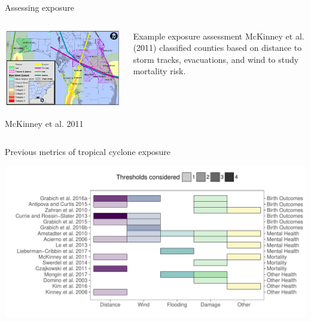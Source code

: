\documentclass[ignorenonframetext,]{beamer}
\begin{document}
\begin{frame}{Assessing exposure}

\begin{columns}
\begin{column}{0.7\textwidth}

\begin{center}\includegraphics[width=\textwidth]{florida_direct_indirect_mortality_figure} \end{center}
\vspace{-0.6cm}
\begin{center}
\footnotesize McKinney et al. 2011
\end{center}
\end{column}
\begin{column}{0.3\textwidth}
\small
\begin{block}{Example exposure assessment}
McKinney et al. (2011) classified counties based on distance to storm tracks, evacuations, and wind to study mortality risk.
\end{block}
\end{column}
\end{columns}

\end{frame}

\begin{frame}{Previous metrics of tropical cyclone exposure}

\begin{center}\includegraphics[width=\textwidth]{previous_exposure_metrics} \end{center}

\end{frame}
\end{document}
